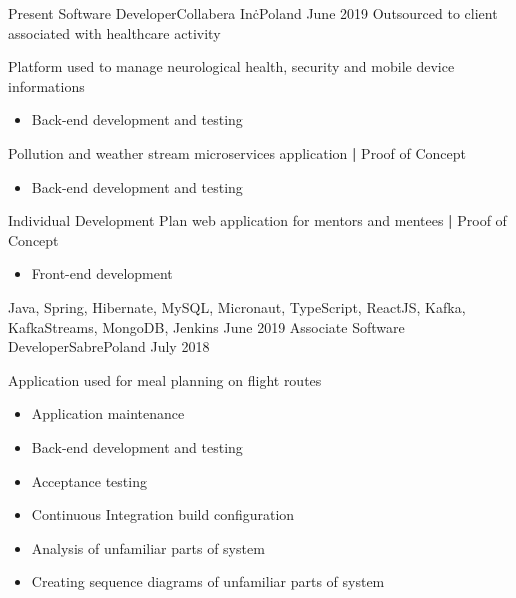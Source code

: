 
\begin{experiences}
  \contractorexperience
    {Present}   {Software Developer}{Collabera Inc\.}{Poland}
    {June 2019} {Outsourced to client associated with healthcare activity}
                {
                        Platform used to manage neurological health, security and mobile device informations
                        \begin{itemize}
                            \item Back-end development and testing      
                        \end{itemize}
                        Pollution and weather stream microservices application \textbf{|} \small{Proof of Concept}\normalsize
                        \begin{itemize}
                            \item Back-end development and testing  
                        \end{itemize}
                        Individual Development Plan web application for mentors and mentees \textbf{|} \small{Proof of Concept}\normalsize
                        \begin{itemize}
                            \item Front-end development
                        \end{itemize}
                    }
                    {Java, Spring, Hibernate, MySQL, Micronaut, TypeScript, ReactJS, Kafka, KafkaStreams, MongoDB, Jenkins}
  \emptySeparator
  \experience
    {June 2019} {Associate Software Developer}{Sabre}{Poland}
    {July 2018}    {
                        Application used for meal planning on flight routes
                        \begin{itemize}
                            \item Application maintenance
                            \item Back-end development and testing
                            \item Acceptance testing
                            \item Continuous Integration build configuration
                            \item Analysis of unfamiliar parts of system
                            \item Creating sequence diagrams of unfamiliar parts of system  

\end{itemize}}
\end{experiences}
